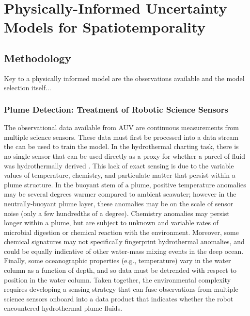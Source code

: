 \chapter{Physically-Informed Uncertainty Models for Spatiotemporality}


\section{Methodology}
\label{sec:methods}
Key to a physically informed model are the observations available and the model selection itself...


\subsection{Plume Detection: Treatment of Robotic Science Sensors}
\label{sec:sensor_models}
The observational data available from AUV \Sentry are continuous measurements from multiple science sensors. These data must first be processed into a data stream the can be used to train the \PHUMES model. In the hydrothermal charting task, there is no single sensor that can be used directly as a proxy for whether a parcel of fluid was hydrothermally derived \autocite{jakuba2007stochastic,preston2022discovering}. This lack of exact sensing is due to the variable values of temperature, chemistry, and particulate matter that persist within a plume structure. In the buoyant stem of a plume, positive temperature anomalies may be several degrees warmer compared to ambient seawater; however in the neutrally-buoyant plume layer, these anomalies may be on the scale of sensor noise (only a few hundredths of a degree). Chemistry anomalies may persist longer within a plume, but are subject to unknown and variable rates of microbial digestion or chemical reaction with the environment. Moreover, some chemical signatures may not specifically fingerprint hydrothermal anomalies, and could be equally indicative of other water-mass mixing events in the deep ocean. Finally, some oceanographic properties (e.g., temperature) vary in the water column as a function of depth, and so data must be detrended with respect to position in the water column. Taken together, the environmental complexity requires developing a sensing strategy that can fuse observations from multiple science sensors onboard \Sentry into a data product that indicates whether the robot encountered hydrothermal plume fluids. 


